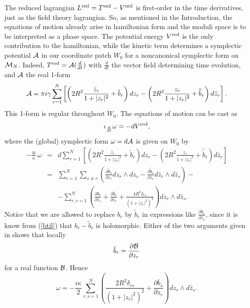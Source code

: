 \documentclass[a4paper,11pt]{article}
\begin{document}
The reduced lagrangian $L^{\rm red}=T^{\rm red}-V^{\rm red}$ is
first-order in the time derivatives, just as the field theory
lagrangian. So, as mentioned in the Introduction, 
the equations of motion already arise in hamiltonian form and
the moduli space is to be interpreted as a phase space.
The potential energy $V^{\rm red}$ is the only contribution to the
hamiltonian, while the kinetic term determines a symplectic 
potential ${\cal A}$ in our coordinate patch $W_{0}$ for a noncanonical 
symplectic form on ${\cal M}_{N}$.
Indeed, $T^{\rm red}={\cal A}(\frac{d}{dt})$ with $\frac{d}{dt}$ the
vector field determining time evolution, and ${\cal A}$ the real 1-form
\begin{equation}\label{unitconn}
{\cal A} = \pi i \gamma \sum_{r=1}^{N} \left[
\left( 2 R^{2}\frac{\bar{z}_{r}}{1+|z_{r}|^{2}}+\tilde{b}_{r}\right)dz_{r}
-\left(
2 R^{2}\frac{{z}_{r}}{1+|z_{r}|^{2}}+\bar{\tilde{b}}_{r}\right)
d\bar{z}_{r}
\right].
\end{equation}
This 1-form is regular throughout $W_{0}$.
The equations of motion can be cast as
\[
\iota_{\frac{d}{dt}}\omega=-dV^{\rm red},
\]
where the (global) symplectic form $\omega=d{\cal A}$ is given on $W_{0}$ by
\begin{eqnarray*}
-\frac{4i}{\kappa}\,\omega&=&d\sum_{r=1}^{N}\left[
\left(2 R^{2}\frac{\bar{z}_{r}}{1+|z_{r}|^{2}}+\tilde{b}_{r}\right)dz_{r}
-\left(2 R^{2}\frac{{z}_{r}}{1+|z_{r}|^{2}}+\bar{\tilde{b}}_{r}\right)
d\bar{z}_{r}
\right]\\
&=&\sum_{r=1}^{N}\sum_{s\ne r}
\left(\frac{\partial \tilde{b}_{s}}{\partial z_{r}}dz_{r}\wedge dz_{s}
-\frac{\partial \bar{\tilde{b}}_{s}}{\partial \bar{z}_{r}}
d\bar{z}_{r}\wedge d\bar{z}_{s}\right)-\\
&&-
\sum_{r,s=1}^{N}\left(\frac{\partial b_{r}}{\partial \bar{z}_{s}}+
\frac{\partial \bar{b}_{s}}{\partial z_{r}}+
\frac{4 R^{2} \delta_{rs}}{\left( 1+|z_{r}|^{2}\right)^{2}}\right)
dz_{r}\wedge d\bar{z}_{s}.
\end{eqnarray*}
Notice that we are allowed to replace $b_{r}$ by $\tilde{b}_{r}$
in expressions like $\frac{\partial b_{r}}{\partial \bar{z}_{s}}$,
since it is know from (\ref{btil}) that $b_{r}-\tilde{b}_{r}$ is holomorphic.
Either of the two arguments given in \cite{Sam} shows that locally
\begin{equation}\label{bpotential}
\tilde{b}_{r}=\frac{\partial {\cal B}}{\partial z_{r}}
\end{equation}
for a real function ${\cal B}$. Hence
\begin{equation}\label{omega}
\omega=-\frac{i\kappa}{2}\sum_{r,s=1}^{N}
\left(\frac{2 R^{2}\delta_{rs}}{\left(1+|z_{r}|^{2}\right)^{2}}+
\frac{\partial \bar{b}_{s}}{\partial z_{r}}\right)
dz_{r}\wedge d\bar{z}_{s}.
\end{equation}
\end{document}
